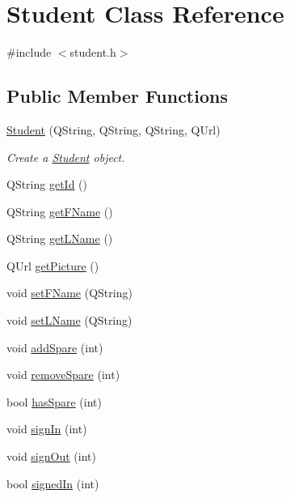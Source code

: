 \hypertarget{class_student}{}\section{Student Class Reference}
\label{class_student}


{\ttfamily \#include $<$student.\+h$>$}

\subsection*{Public Member Functions}
\begin{DoxyCompactItemize}
\item 
\hyperlink{class_student_a401c97494a279a046c2a95858bc04df7}{Student} (Q\+String, Q\+String, Q\+String, Q\+Url)
\begin{DoxyCompactList}\small\item\em Create a \hyperlink{class_student}{Student} object. \end{DoxyCompactList}\item 
Q\+String \hyperlink{class_student_ac314c299fce856ec970b3a358ca4ea86}{get\+Id} ()
\item 
Q\+String \hyperlink{class_student_a6d4783d4c7ce33aa57e3cd27ac43ab91}{get\+F\+Name} ()
\item 
Q\+String \hyperlink{class_student_a78345c7bbbb179675b332facbc45c11f}{get\+L\+Name} ()
\item 
Q\+Url \hyperlink{class_student_a897fcf6f93b238dec7272f36397ab2d1}{get\+Picture} ()
\item 
void \hyperlink{class_student_ac840a04f792b83ec859be96d4d049e04}{set\+F\+Name} (Q\+String)
\item 
void \hyperlink{class_student_abe86e9e7bc373a8ffa0a9654ded0fe28}{set\+L\+Name} (Q\+String)
\item 
void \hyperlink{class_student_a582d885b873be768e0e95e45d38d8f0e}{add\+Spare} (int)
\item 
void \hyperlink{class_student_a59651e4e76bc19afca6e31cd91ba7aa0}{remove\+Spare} (int)
\item 
bool \hyperlink{class_student_a2c923389f39d4564829f5cf422cfef96}{has\+Spare} (int)
\item 
void \hyperlink{class_student_a51f1de2461562ab241af8392a536d224}{sign\+In} (int)
\item 
void \hyperlink{class_student_a8124778da762c247391697e871b31983}{sign\+Out} (int)
\item 
bool \hyperlink{class_student_af2f651f1533f158c0b95bddcb6c299fd}{signed\+In} (int)
\end{DoxyCompactItemize}


